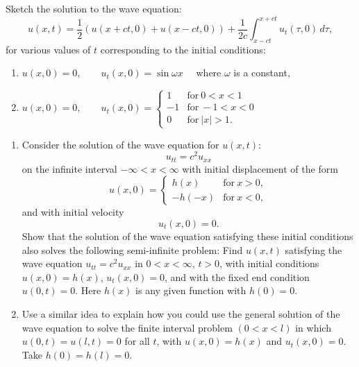 {%
\begin{Exercise}
  Sketch the solution to the wave equation:
  \[
  u(x,t) = \frac{1}{2} \left( u(x+ct,0) + u(x-ct,0)\right) + 
  \frac{1}{2c} \int_{x-ct}^{x+ct} u_t(\tau,0) \,d\tau,
  \]
  for various values of $t$ corresponding to the initial conditions:
  \begin{enumerate}
  \item 
    $ \displaystyle u(x,0) = 0,\qquad u_t(x,0) = \sin \omega x \quad$ where
    $\omega$ is a constant, 
  \item 
    $ \displaystyle 
    u(x,0) = 0, \qquad 
    u_t(x,0) = 
    \begin{cases}
      1       &\mathrm{for}\ 0 < x < 1 \\
      -1      &\mathrm{for}\ -1 < x < 0 \\
      0       &\mathrm{for}\ |x|  > 1 .
    \end{cases}
    $
  \end{enumerate}
\end{Exercise}



\begin{Exercise}
  \begin{enumerate}
  \item 
    Consider the solution of the wave equation for $u(x,t)$:
    \[
    u_{tt} = c^2 u_{xx}
    \]
    on the infinite interval $-\infty < x < \infty$ with initial
    displacement of the form
    \[
    u(x,0) = 
    \begin{cases}
      h(x)    &\mathrm{for}\ x > 0, \\
      -h(-x)  &\mathrm{for}\ x < 0,
    \end{cases}
    \]
    and with initial velocity
    \[
    u_t(x,0) = 0.
    \]
    Show that the solution of the wave equation satisfying these initial
    conditions also solves the following semi-infinite problem: Find $u(x,t)$
    satisfying the wave equation $u_{tt} = c^2 u_{xx}$
    in $0 < x < \infty$, $ t > 0$, with initial conditions $u(x,0) = h(x)$,
    $u_t(x,0) = 0$, and with the fixed end condition $u(0,t) = 0$. Here $h(x)$ is 
    any given function with $h(0) = 0$. 
  \item 
    Use a similar idea to explain how you could use the general 
    solution of the wave equation to solve the finite interval problem
    $(0 < x < l)$ 
    in which $u(0,t) = u(l,t) = 0$ for all $t$, with $u(x,0) = h(x)$ and
    $u_t(x,0) = 0$. Take $h(0) = h(l) = 0$.
  \end{enumerate}
\end{Exercise}




}
